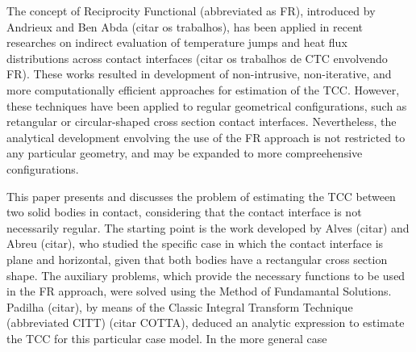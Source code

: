 \documentclass[conference,compsoc]{IEEEtran}
\begin{document}
The concept of Reciprocity Functional (abbreviated as FR), introduced by Andrieux and Ben Abda (citar os trabalhos), has been applied in recent researches on indirect evaluation of temperature jumps and heat flux distributions across contact interfaces (citar os trabalhos de CTC envolvendo FR). These works resulted in development of non-intrusive, non-iterative, and more computationally efficient approaches for estimation of the TCC. However, these techniques have been applied to regular geometrical configurations, such as retangular or circular-shaped cross section contact interfaces. Nevertheless, the analytical development envolving the use of the FR approach is not restricted to any particular geometry, and may be expanded to more compreehensive configurations.

This paper presents and discusses the problem of estimating the TCC between two solid bodies in contact, considering that the contact interface is not necessarily regular. The starting point is the work developed by Alves (citar) and Abreu (citar), who studied the specific case in which the contact interface is plane and horizontal, given that both bodies have a rectangular cross section shape. The auxiliary problems, which provide the necessary functions to be used in the FR approach, were solved using the Method of Fundamantal Solutions. Padilha (citar), by means of the Classic Integral Transform Technique (abbreviated CITT) (citar COTTA), deduced an analytic expression to estimate the TCC for this particular case model. In the more general case 
\end{document}
